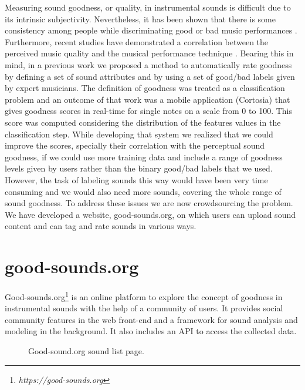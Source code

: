 \documentclass{article}
\begin{document}
Measuring sound goodness, or quality, in instrumental sounds is difficult due to its intrinsic subjectivity. Ne\-ver\-theless, it has been shown that there is some consistency among people while discriminating good or bad music performances \cite{1}. Furthermore, recent studies have demonstrated a correlation between the perceived music quality and the musical performance technique \cite{2}. Bearing this in mind, in a previous work \cite{01} we proposed a method to automatically rate goodness by defining a set of sound attributes and by using a set of good/bad labels given by expert musicians. The definition of goodness was treated as a classification problem and an outcome of that work was a mobile application (Cortosia) that gives goodness scores in real-time for single notes on a scale from 0 to 100. This score was computed considering the distribution of the features values in the classification step. While developing that system we realized that we could improve the scores, specially their correlation with the perceptual sound goodness, if we could use more training data and include a range of goodness levels given by users rather than the binary good/bad labels that we used. However, the task of labeling sounds this way would have been very time consuming and we would  also need more sounds, covering the whole range of sound goodness. To address these issues we are now crowdsourcing the problem. We have developed a website, good-sounds.org, on which users can upload sound content and can tag and rate sounds in various ways.      
%
\section{good-sounds.org}\label{sec:goodsounds}
Good-sounds.org\footnote{\textit{https://good-sounds.org}} is an online platform to explore the concept of goodness in instrumental sounds with the help of a community of users. It provides social community features in the web front-end and a framework for sound analysis and modeling in the background. It also includes an API to access the collected data.

\begin{figure}[ht]
 \centerline{}
 \caption{Good-sound.org sound list page.}
 \label{fig:sound_list}
\end{figure}
\end{document}
